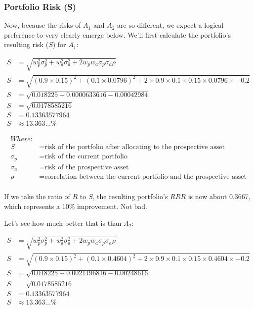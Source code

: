 \documentclass[]{article}
\begin{document}
\hypertarget{portfolio-risk-s}{%
\subsubsection{Portfolio Risk (S)}\label{portfolio-risk-s}}

Now, because the risks of \(A_1\) and \(A_2\) are so different, we
expect a logical preference to very clearly emerge below. We'll first
calculate the portfolio's resulting risk (\(S\)) for \(A_1\):

\[
\begin{aligned}
S & = \sqrt{w_p^2 \sigma_p^2 + w_a^2 \sigma_a^2 + 2 w_p w_a \sigma_p \sigma_a \rho} \\
S & = \sqrt{(0.9 \times 0.15)^2 + (0.1 \times 0.0796)^2 + 2 \times 0.9 \times 0.1 \times 0.15 \times 0.0796 \times -0.2} \\
S & = \sqrt{0.018225 + 0.0000633616 - 0.00042984} \\
S & = \sqrt{0.0178585216} \\
S & = 0.13363577964 \\
S & \approx 13.363...\% 
\end{aligned}
\]

\[
\begin{aligned}
Where: & \\
S & = \text{risk of the portfolio after allocating to the prospective asset} \\
\sigma_p & = \text{risk of the current portfolio} \\
\sigma_a & = \text{risk of the prospective asset} \\
\rho & = \text{correlation between the current portfolio and the prospective asset} \\
\end{aligned}
\]

If we take the ratio of \(R\) to \(S\), the resulting portfolio's
\(RRR\) is now about 0.3667, which represents a 10\% improvement. Not
bad.

Let's see how much better that is than \(A_2\):

\[
\begin{aligned}
S & = \sqrt{w_p^2 \sigma_p^2 + w_a^2 \sigma_a^2 + 2 w_p w_a \sigma_p \sigma_a \rho} \\
S & = \sqrt{(0.9 \times 0.15)^2 + (0.1 \times 0.4604)^2 + 2 \times 0.9 \times 0.1 \times 0.15 \times 0.4604 \times -0.2} \\
S & = \sqrt{0.018225 + 0.0021196816 - 0.00248616} \\
S & = \sqrt{0.0178585216} \\
S & = 0.13363577964 \\
S & \approx 13.363...\% 
\end{aligned}
\]
\end{document}
